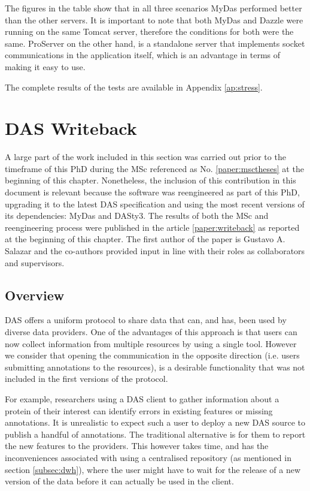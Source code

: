 The figures in the table show that in all three scenarios MyDas performed better than the other servers. It is important to note that both MyDas and Dazzle were running on the same Tomcat server, therefore the conditions for both were the same. ProServer on the other hand, is a standalone server that implements socket communications in the application itself, which is an advantage in terms of making it easy to use.

The complete results of the tests are available in Appendix \ref{ap:stress}.








\section{DAS Writeback}\label{section:writeback}

A large part of the work included in this section was carried out prior to the timeframe of this PhD during the MSc referenced as No. \ref{paper:msctheses} at the beginning of this chapter. Nonetheless, the inclusion of this contribution in this document is relevant because the software was reengineered as part of this PhD, upgrading it to the latest DAS specification and using the most recent versions of its dependencies: MyDas and DASty3. The results of both the MSc and reengineering process were published in the article \ref{paper:writeback} as reported at the beginning of this chapter. The first author of the paper is Gustavo A. Salazar and the co-authors provided input in line with their roles as collaborators and supervisors. 

\subsection{Overview}
DAS offers a uniform protocol to share data that can, and has, been used by diverse data providers. One of the advantages of this approach is that users can now  collect information from multiple resources by using a single tool. However we consider that opening the communication in the opposite direction (i.e. users submitting annotations to the resources), is a desirable functionality that was not included in the first versions of the protocol.

For example, researchers using a DAS client to gather information about a protein of their interest can identify errors in existing features or missing annotations. It is unrealistic to expect such a user to deploy a new DAS source to publish a handful of annotations. The traditional alternative is for them to report the new features to the providers. This however takes time, and has the inconveniences associated with using a centralised repository (as mentioned in section \ref{subsec:dwh}), where the user might have to wait for the release of a new version of the data before it can actually be used in the client.

